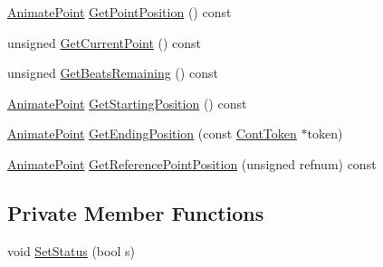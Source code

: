 \begin{DoxyCompactItemize}
\item 
\hyperlink{a00196_a91212e6bb797b2b440819b6a9a86f702}{Animate\-Point} \hyperlink{a00007_ae670d64339321051cbb382525530eff0}{Get\-Point\-Position} () const 
\item 
unsigned \hyperlink{a00007_a6406e70747c4bdc0fb8d30b5e71bf3b2}{Get\-Current\-Point} () const 
\item 
unsigned \hyperlink{a00007_a3d824c8de9d6e906a6d14d5011ded73f}{Get\-Beats\-Remaining} () const 
\item 
\hyperlink{a00196_a91212e6bb797b2b440819b6a9a86f702}{Animate\-Point} \hyperlink{a00007_ae4ba7526a293c2cdbada00e592bd21a6}{Get\-Starting\-Position} () const 
\item 
\hyperlink{a00196_a91212e6bb797b2b440819b6a9a86f702}{Animate\-Point} \hyperlink{a00007_afe8f5e9a0d727dc134497a1783ca7656}{Get\-Ending\-Position} (const \hyperlink{a00085}{Cont\-Token} $\ast$token)
\item 
\hyperlink{a00196_a91212e6bb797b2b440819b6a9a86f702}{Animate\-Point} \hyperlink{a00007_ab55c26d9886d951d63f9415e653e865c}{Get\-Reference\-Point\-Position} (unsigned refnum) const 
\end{DoxyCompactItemize}
\subsection*{Private Member Functions}
\begin{DoxyCompactItemize}
\item 
void \hyperlink{a00007_a1fafdaa29093c8abfc725a9dad511966}{Set\-Status} (bool s)
\end{DoxyCompactItemize}

